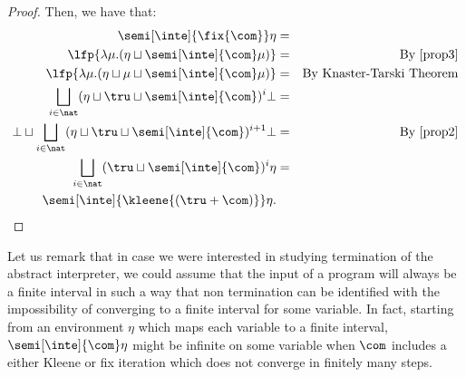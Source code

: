 \begin{proof}
  Then, we have that:
  \begin{align*}
    \semi[\inte]{\fix{\com}} \eta & = \\
    \lfp{\lambda \mu. (\eta \sqcup \semi[\inte]{\com} \mu)} & = &  \text{By \eqref{prop3}}\\
    \lfp{\lambda \mu. (\eta \sqcup \mu \sqcup \semi[\inte]{\com} \mu)} & = & \text{By Knaster-Tarski Theorem} \\
    \bigsqcup_{i \in \nat} (\eta \sqcup \tru \sqcup \semi[\inte]{\com})^i \bot & = \\
    \bot \sqcup \bigsqcup_{i \in \nat} (\eta \sqcup \tru \sqcup \semi[\inte]{\com})^{i+1} \bot & = & \text{By \eqref{prop2}}\\
    \bigsqcup_{i \in \nat} (\tru \sqcup \semi[\inte]{\com})^{i} \eta & = \\
    \semi[\inte]{\kleene{(\tru + \com)}} \eta. &
  \end{align*}  
\end{proof}

\begin{remark}
  Let us remark that in case we were interested in studying
  termination of the abstract interpreter, we could assume that the
  input of a program will always be a finite interval in such a way
  that non termination can be identified with the impossibility of
  converging to a finite interval for some variable. In fact, starting
  from an environment \(\eta\) which maps each variable to a finite
  interval, \(\semi[\inte]{\com}\eta\) might be infinite on some variable
  when \(\com\) includes a either Kleene or fix iteration which does
  not converge in finitely many steps.
\end{remark}